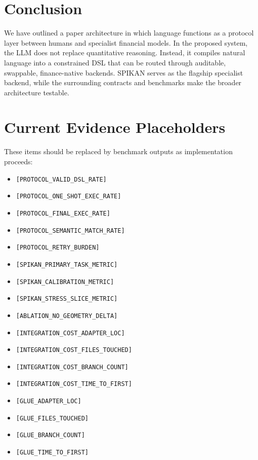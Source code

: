 \documentclass[11pt]{article}
\begin{document}
\section{Conclusion}

We have outlined a paper architecture in which language functions as a protocol
layer between humans and specialist financial models. In the proposed system,
the LLM does not replace quantitative reasoning. Instead, it compiles natural
language into a constrained DSL that can be routed through auditable, swappable,
finance-native backends. SPIKAN serves as the flagship specialist backend, while
the surrounding contracts and benchmarks make the broader architecture testable.

\appendix

\section{Current Evidence Placeholders}

These items should be replaced by benchmark outputs as implementation proceeds:
\begin{itemize}[leftmargin=*]
  \item \texttt{[PROTOCOL\_VALID\_DSL\_RATE]}
  \item \texttt{[PROTOCOL\_ONE\_SHOT\_EXEC\_RATE]}
  \item \texttt{[PROTOCOL\_FINAL\_EXEC\_RATE]}
  \item \texttt{[PROTOCOL\_SEMANTIC\_MATCH\_RATE]}
  \item \texttt{[PROTOCOL\_RETRY\_BURDEN]}
  \item \texttt{[SPIKAN\_PRIMARY\_TASK\_METRIC]}
  \item \texttt{[SPIKAN\_CALIBRATION\_METRIC]}
  \item \texttt{[SPIKAN\_STRESS\_SLICE\_METRIC]}
  \item \texttt{[ABLATION\_NO\_GEOMETRY\_DELTA]}
  \item \texttt{[INTEGRATION\_COST\_ADAPTER\_LOC]}
  \item \texttt{[INTEGRATION\_COST\_FILES\_TOUCHED]}
  \item \texttt{[INTEGRATION\_COST\_BRANCH\_COUNT]}
  \item \texttt{[INTEGRATION\_COST\_TIME\_TO\_FIRST]}
  \item \texttt{[GLUE\_ADAPTER\_LOC]}
  \item \texttt{[GLUE\_FILES\_TOUCHED]}
  \item \texttt{[GLUE\_BRANCH\_COUNT]}
  \item \texttt{[GLUE\_TIME\_TO\_FIRST]}
\end{itemize}
\end{document}
